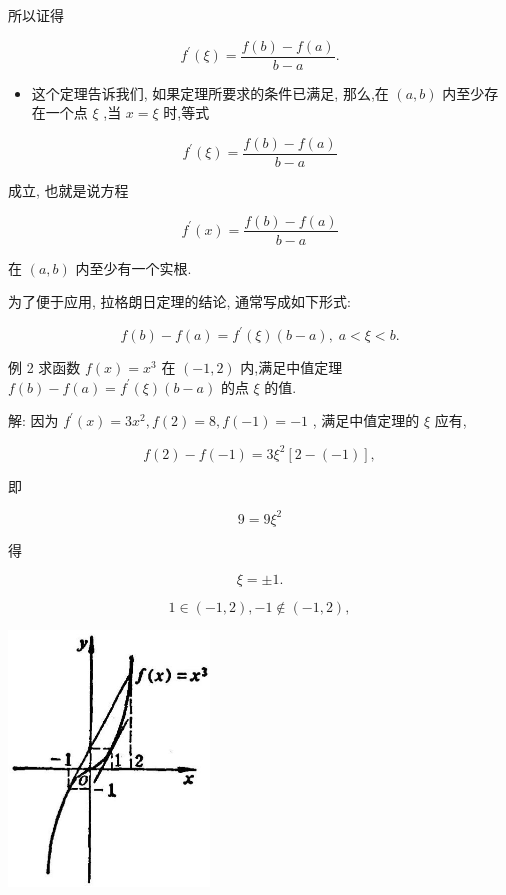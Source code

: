 \documentclass[lang=cn,newtx,10pt,scheme=chinese]{elegantbook}
\begin{document}
所以证得

\[
{f}^{\prime }\left( \xi \right) = \frac{f\left( b\right) - f\left( a\right) }{b - a}.
\]

\begin{itemize}
\item 这个定理告诉我们, 如果定理所要求的条件已满足, 那么,在 \(\left( {a,b}\right)\) 内至少存在一个点 \(\xi\) ,当 \(x = \xi\) 时,等式
\end{itemize}

\[
{f}^{\prime }\left( \xi \right) = \frac{f\left( b\right) - f\left( a\right) }{b - a}
\]

成立, 也就是说方程

\[
{f}^{\prime }\left( x\right) = \frac{f\left( b\right) - f\left( a\right) }{b - a}
\]

在 \(\left( {a,b}\right)\) 内至少有一个实根.

为了便于应用, 拉格朗日定理的结论, 通常写成如下形式:

\[
f\left( b\right) - f\left( a\right) = {f}^{\prime }\left( \xi \right) \left( {b - a}\right) ,\;a < \xi < b.
\]

例 2 求函数 \(f\left( x\right) = {x}^{3}\) 在 \(\left( {-1,2}\right)\) 内,满足中值定理 \(f\left( b\right) - f\left( a\right) = {f}^{\prime }\left( \xi \right) \left( {b - a}\right)\) 的点 \(\xi\) 的值.

解: 因为 \({f}^{\prime }\left( x\right) = 3{x}^{2},f\left( 2\right) = 8,f\left( {-1}\right) = - 1\) , 满足中值定理的 \(\xi\) 应有,

\[
f\left( 2\right) - f\left( {-1}\right) = 3{\xi }^{2}\left\lbrack {2 - \left( {-1}\right) }\right\rbrack ,
\]

即

\[
9 = 9{\xi }^{2}
\]

得

\[
\xi = \pm 1\text{.}
\]

\[
1 \in \left( {-1,2}\right) , - 1 \notin \left( {-1,2}\right) ,
\]

\begin{center}
\includegraphics[max width=0.4\textwidth]{images/01912c18-5c3f-733d-b775-749ba9897a9d_135_695444.jpg}
\end{center}
\end{document}
